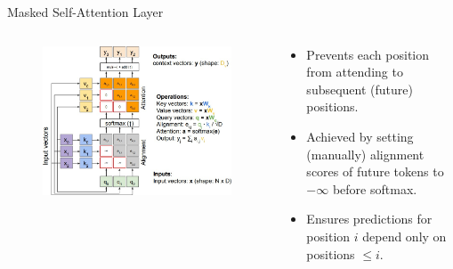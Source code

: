 \begin{frame}[allowframebreaks]{Masked Self-Attention Layer}
    \begin{columns}
    \begin{column}{0.6\textwidth}
        \begin{figure}
            \flushleft
            \includegraphics[width=\linewidth,height=\textheight,keepaspectratio]{images/transformers/slide_46_1_img.jpg}
        \end{figure}
    \end{column}
    \begin{column}{0.5\textwidth}
        \begin{itemize}
            \item Prevents each position from attending to subsequent (future) positions.
            \item Achieved by setting (manually) alignment scores of future tokens to $-\infty$ before softmax.
            \item Ensures predictions for position $i$ depend only on positions $\leq i$.
        \end{itemize}
    \end{column}
    \end{columns}
\end{frame}